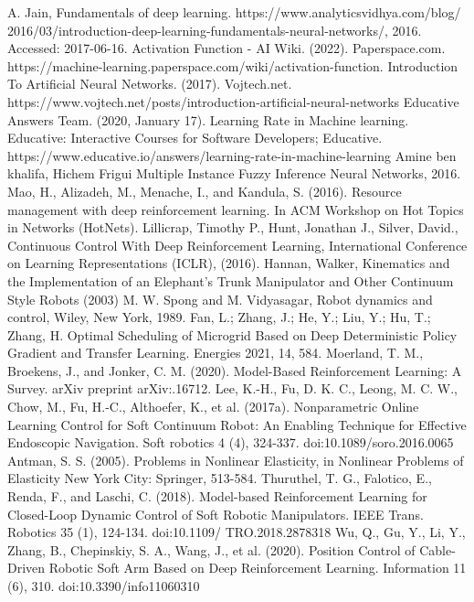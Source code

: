 \documentclass[12pt,twoside,a4]{mwbk}
\begin{document}
\begin{thebibliography}{9}
 A. Jain, Fundamentals of deep learning. https://www.analyticsvidhya.com/blog/ 2016/03/introduction-deep-learning-fundamentals-neural-networks/, 2016. Accessed: 2017-06-16.
 Activation Function - AI Wiki. (2022). Paperspace.com. https://machine-learning.paperspace.com/wiki/activation-function.
 Introduction To Artificial Neural Networks. (2017). Vojtech.net. https://www.vojtech.net/posts/introduction-artificial-neural-networks
 Educative Answers Team. (2020, January 17). Learning Rate in Machine learning. Educative: Interactive Courses for Software Developers; Educative. https://www.educative.io/answers/learning-rate-in-machine-learning
 Amine ben khalifa, Hichem Frigui Multiple Instance Fuzzy Inference Neural Networks, 2016.
 Mao, H., Alizadeh, M., Menache, I., and Kandula, S. (2016). Resource management with deep reinforcement learning. In ACM Workshop on Hot Topics in Networks (HotNets).
 Lillicrap, Timothy P., Hunt, Jonathan J., Silver, David., Continuous Control With Deep Reinforcement Learning, International Conference on Learning Representations (ICLR), (2016).
 Hannan, Walker, Kinematics and the Implementation of an Elephant's Trunk Manipulator and Other Continuum Style Robots (2003)
 M. W. Spong and M. Vidyasagar, Robot dynamics and control, Wiley, New York, 1989.
 Fan, L.; Zhang, J.; He, Y.; Liu, Y.; Hu, T.; Zhang, H. Optimal Scheduling of Microgrid Based on Deep Deterministic Policy Gradient and Transfer Learning. Energies 2021, 14, 584.
 Moerland, T. M., Broekens, J., and Jonker, C. M. (2020). Model-Based Reinforcement Learning: A Survey. arXiv preprint arXiv:.16712.
 Lee, K.-H., Fu, D. K. C., Leong, M. C. W., Chow, M., Fu, H.-C., Althoefer, K., et al. (2017a). Nonparametric Online Learning Control for Soft Continuum Robot: An Enabling Technique for Effective Endoscopic Navigation. Soft robotics 4 (4), 324-337. doi:10.1089/soro.2016.0065
 Antman, S. S. (2005). Problems in Nonlinear Elasticity, in Nonlinear Problems of Elasticity New York City: Springer, 513-584.
 Thuruthel, T. G., Falotico, E., Renda, F., and Laschi, C. (2018). Model-based Reinforcement Learning for Closed-Loop Dynamic Control of Soft Robotic Manipulators. IEEE Trans. Robotics 35 (1), 124-134. doi:10.1109/ TRO.2018.2878318
 Wu, Q., Gu, Y., Li, Y., Zhang, B., Chepinskiy, S. A., Wang, J., et al. (2020). Position Control of Cable-Driven Robotic Soft Arm Based on Deep Reinforcement Learning. Information 11 (6), 310. doi:10.3390/info11060310

\end{thebibliography}
\end{document}

